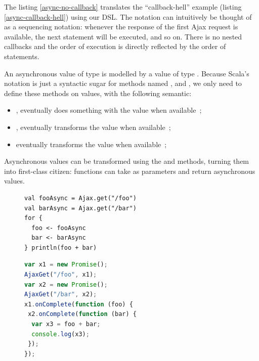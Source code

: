 \documentclass[american,english,runningheads]{llncs}
\begin{document}
The listing \ref{async-no-callback} translates the “callback-hell” example (listing \ref{async-callback-hell}) using
our DSL. The  notation can intuitively be thought of as a sequencing notation: whenever the response of the
first Ajax request is available, the next statement will be executed, and so on. There is no nested callbacks and the
order of execution is directly reflected by the order of statements.

An asynchronous value of type  is modelled by a value of type . Because Scala’s
 notation is just a syntactic sugar for methods named ,  and , we
only need to define these methods on  values, with the following semantic:
\begin{itemize}
\item {}, eventually does something with the value when available~;
\item {}, eventually transforms the value when available~;
\item {} eventually transforms the value when available~;
\end{itemize}

Asynchronous values can be transformed using the  and  methods, turning them into first-class
citizen: functions can take as parameters and return asynchronous values.

\begin{figure}
\begin{multicols}{2}
\begin{lstlisting}[caption=Parallel computations in Scala,label=async-parallel-1]
val fooAsync = Ajax.get("/foo")
val barAsync = Ajax.get("/bar")
for {
  foo <- fooAsync
  bar <- barAsync
} println(foo + bar)
\end{lstlisting}
\vfill
\columnbreak
\begin{lstlisting}[language=JavaScript,caption=Generated JavaScript code,label=async-parallel-2]
var x1 = new Promise();
AjaxGet("/foo", x1);
var x2 = new Promise();
AjaxGet("/bar", x2);
x1.onComplete(function (foo) {
 x2.onComplete(function (bar) {
  var x3 = foo + bar;
  console.log(x3);
 });
});
\end{lstlisting}
\end{multicols}
\end{figure}
\end{document}
